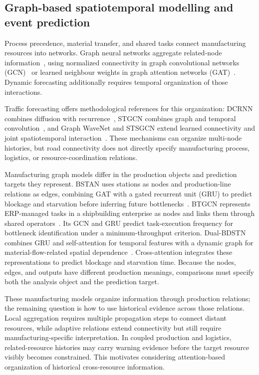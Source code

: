 \documentclass[a4paper,fleqn]{cas-dc}
\begin{document}
\subsection{Graph-based spatiotemporal modelling and event prediction}

Process precedence, material transfer, and shared tasks connect manufacturing resources into networks. Graph neural networks aggregate related-node information~\cite{wu2021gnn}, using normalized connectivity in graph convolutional networks (GCN)~\cite{kipf2017gcn} or learned neighbour weights in graph attention networks (GAT)~\cite{velickovic2018gat}. Dynamic forecasting additionally requires temporal organization of those interactions.

Traffic forecasting offers methodological references for this organization: DCRNN combines diffusion with recurrence~\cite{li2018dcrnn}, STGCN combines graph and temporal convolution~\cite{yu2018stgcn}, and Graph WaveNet and STSGCN extend learned connectivity and joint spatiotemporal interaction~\cite{wu2019graphwavenet,song2020stsgcn}. These mechanisms can organize multi-node histories, but road connectivity does not directly specify manufacturing process, logistics, or resource-coordination relations.

Manufacturing graph models differ in the production objects and prediction targets they represent. BSTAN uses stations as nodes and production-line relations as edges, combining GAT with a gated recurrent unit (GRU) to predict blockage and starvation before inferring future bottlenecks~\cite{lai2023bstan}. BTGCN represents ERP-managed tasks in a shipbuilding enterprise as nodes and links them through shared operators~\cite{yin2025btgcn}. Its GCN and GRU predict task-execution frequency for bottleneck identification under a minimum-throughput criterion. Dual-BDSTN combines GRU and self-attention for temporal features with a dynamic graph for material-flow-related spatial dependence~\cite{cen2025dstnn}. Cross-attention integrates these representations to predict blockage and starvation time. Because the nodes, edges, and outputs have different production meanings, comparisons must specify both the analysis object and the prediction target.

These manufacturing models organize information through production relations; the remaining question is how to use historical evidence across those relations. Local aggregation requires multiple propagation steps to connect distant resources, while adaptive relations extend connectivity but still require manufacturing-specific interpretation. In coupled production and logistics, related-resource histories may carry warning evidence before the target resource visibly becomes constrained. This motivates considering attention-based organization of historical cross-resource information.
\end{document}
